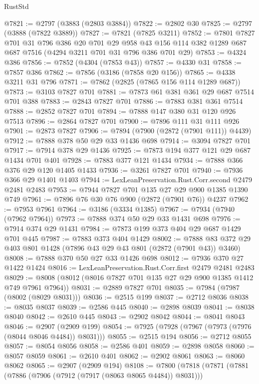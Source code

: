 \begin{lexlean}{RustStd}
\begin{coremodule}
@7821 := @2797 (@3883 (@2803 @3884))
@7822 := @2802 @30
@7825 := @2797 (@3888 (@7822 @3889))
@7827 := @7821 (@7825 @3211)
@7852 := @7801
    @7827
    @701
    @31
    @796
    @386
    @20
    @701
    @29
    @958
    @43
    @156
    @114
    @382
    @1289
    @687
    @687
    @7516
    (@4294 @3211 @701 @31 @796 @386 @701 @29)
@7853 := @4324 @386
@7856 := @7852 (@4304 (@7853 @43))
@7857 := @4330 @31
@7858 := @7857 @386
@7862 := @7856 (@3186 (@7858 @20 @156))
@7865 := @4338 @3211 @31 @796
@7871 := @7862 (@2825 (@7865 @156 @114 @1289 @687))
@7873 := @3103 @7827 @701
@7881 := @7873 @61 @381 @361 @29 @687 @7514 @701 @388
@7883 := @2843 @7827 @701
@7886 := @7883 @381 @361 @7514
@7888 := @2852 @7827 @701
@7894 := @7888 @147 @380 @31 @120 @926 @7513
@7896 := @2864 @7827 @701
@7900 := @7896 @111 @31 @111 @926
@7901 := @2873 @7827
@7906 := @7894 (@7900 (@2872 (@7901 @111)) @4439)
@7912 := @7888 @378 @50 @29 @33 @1436 @698
@7914 := @3094 @7827 @701
@7917 := @7914 @378 @29 @1436
@7925 := @7873 @194 @377 @121 @29 @687 @1434 @701 @401
@7928 := @7883 @377 @121 @1434
@7934 := @7888 @366 @376 @29 @120 @1405 @1433
@7936 := @3261 @7827 @701
@7940 := @7936 @366 @29 @1401 @1403
@7944 := LexLeanPreservation.Rust.Corr.second @2479 @2481 @2483
@7953 := @7944 @7827 @701 @135 @27 @29 @900 @1385 @1390 @749
@7961 := @7896 @76 @30 @76 @900 (@2872 (@7901 @76)) @4237
@7962 := @7953 @7961
@7964 := @3186 (@3334 @1385)
@7967 := @7934 (@7940 (@7962 @7964))
@7973 := @7888 @374 @50 @29 @33 @1431 @698
@7976 := @7914 @374 @29 @1431
@7984 := @7873 @199 @373 @404 @29 @687 @1429 @701 @445
@7987 := @7883 @373 @404 @1429
@8002 := @7888 @83 @372 @29 @403 @801 @1428 (@7896 @43 @29 @43 @801 (@2872 (@7901 @43)) @3460)
@8008 := @7888 @370 @50 @27 @33 @1426 @698
@8012 := @7936 @370 @27 @1422 @1424
@8016 := LexLeanPreservation.Rust.Corr.first @2479 @2481 @2483
@8029 := @8008 (@8012 (@8016 @7827 @701 @135 @27 @29 @900 @1385 @1412 @749 @7961 @7964))
@8031 := @2889 @7827 @701
@8035 := @7984 (@7987 (@8002 (@8029 @8031)))
@8036 := @2515 @199
@8037 := @2712 @8036
@8038 := @8035 @8037
@8039 := @2586 @445
@8040 := @2898 @8039
@8041 := @8038 @8040
@8042 := @2610 @445
@8043 := @2902 @8042
@8044 := @8041 @8043
@8046 := @2907 (@2909 @199)
@8054 := @7925 (@7928 (@7967 (@7973 (@7976 (@8044 @8046 @4484)) @8031)))
@8055 := @2515 @194
@8056 := @2712 @8055
@8057 := @8054 @8056
@8058 := @2586 @401
@8059 := @2898 @8058
@8060 := @8057 @8059
@8061 := @2610 @401
@8062 := @2902 @8061
@8063 := @8060 @8062
@8065 := @2907 (@2909 @194)
@8108 := @7800
    (@7818
      (@7871
        (@7881
          (@7886 (@7906 (@7912 (@7917 (@8063 @8065 @4484)) @8031)))

\end{coremodule}
\end{lexlean}
